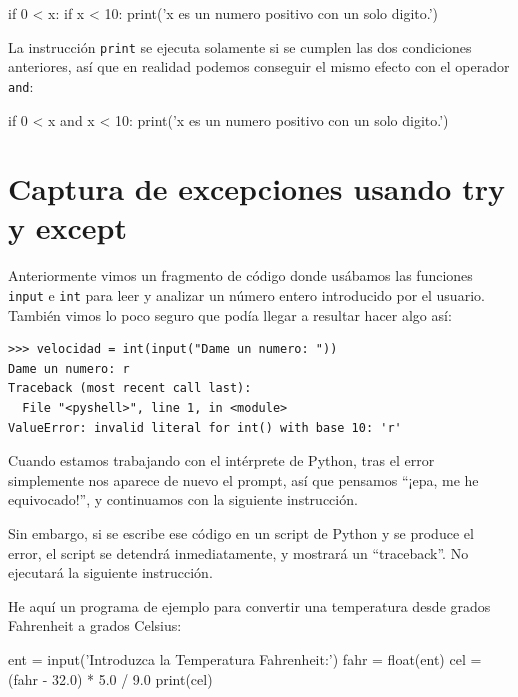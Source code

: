 \begin{python}[frame=single]
if 0 < x:
    if x < 10:
        print('x es un numero positivo con un solo digito.')
\end{python}

La instrucción \texttt{print} se ejecuta solamente si se cumplen las dos
condiciones anteriores, así que en realidad podemos conseguir el mismo
efecto con el operador \texttt{and}:

\begin{python}[frame=single]
if 0 < x and x < 10:
    print('x es un numero positivo con un solo digito.')
\end{python}

\hypertarget{captura-de-excepciones-usando-try-y-except}{%
\section{Captura de excepciones usando try y
except}\label{captura-de-excepciones-usando-try-y-except}}

Anteriormente vimos un fragmento de código donde usábamos las funciones
\texttt{input} e \texttt{int} para leer y analizar un número entero
introducido por el usuario. También vimos lo poco seguro que podía
llegar a resultar hacer algo así:

\begin{Verbatim}[frame=single]
>>> velocidad = int(input("Dame un numero: "))
Dame un numero: r
Traceback (most recent call last):
  File "<pyshell>", line 1, in <module>
ValueError: invalid literal for int() with base 10: 'r'
\end{Verbatim}

Cuando estamos trabajando con el intérprete de Python, tras el error
simplemente nos aparece de nuevo el prompt, así que pensamos ``¡epa, me
he equivocado!'', y continuamos con la siguiente instrucción.

Sin embargo, si se escribe ese código en un script de Python y se
produce el error, el script se detendrá inmediatamente, y mostrará un
``traceback''. No ejecutará la siguiente instrucción.


He aquí un programa de ejemplo para convertir una temperatura desde
grados Fahrenheit a grados Celsius:

  

\begin{python}
ent = input('Introduzca la Temperatura Fahrenheit:')
fahr = float(ent)
cel = (fahr - 32.0) * 5.0 / 9.0
print(cel)
\end{python}

